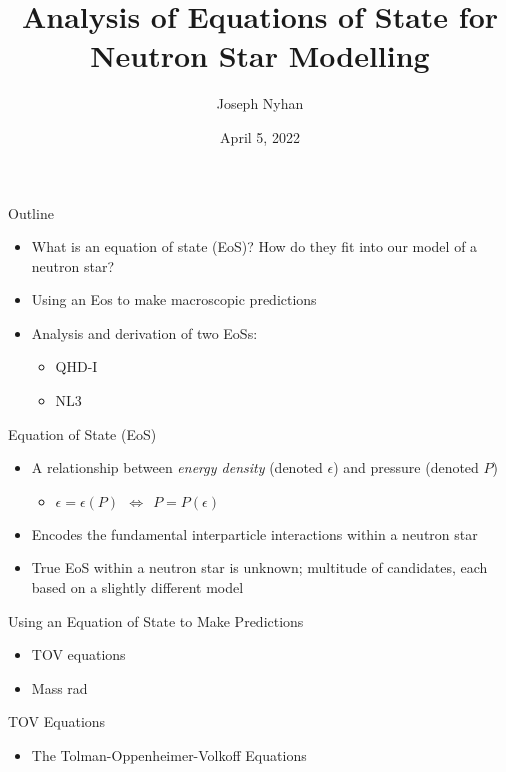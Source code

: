 \documentclass[fleqn,handout]{beamer}
\title{Analysis of Equations of State for Neutron Star Modelling}
\author{Joseph Nyhan}
\date{April 5, 2022}
\institute{College of the Holy Cross}
\begin{document}
    \maketitle

    \begin{frame}{Outline}
        \begin{itemize}
            \item What is an equation of state (EoS)? \pause How do they fit into our model of a neutron star? \pause
            \item Using an Eos to make macroscopic predictions \pause
            \item Analysis and derivation of two EoSs: \pause
            \begin{itemize}
                \item QHD-I \pause
                \item NL3
            \end{itemize}
        \end{itemize}
    \end{frame}

    \begin{frame}{Equation of State (EoS)}
        \begin{itemize}
            \item A relationship between \textit{energy density} (denoted $\epsilon$) \pause and pressure (denoted $P$) \pause \begin{itemize}
                \item $\epsilon = \epsilon (P)$\pause $~~ \Leftrightarrow ~~  P = P(\epsilon)$
            \end{itemize}
            \item Encodes the fundamental interparticle interactions within a neutron star \pause
            \item True EoS within a neutron star is unknown; \pause multitude of candidates, each based on a slightly different model
        \end{itemize}
    \end{frame}

    \begin{frame}{Using an Equation of State to Make Predictions}
        \begin{itemize}
            \item TOV equations \pause
            \item Mass rad
        \end{itemize}
    \end{frame}

    \begin{frame}{TOV Equations}
        \begin{itemize}
            \item The Tolman-Oppenheimer-Volkoff Equations
        \end{itemize}
    \end{frame}
\end{document}
